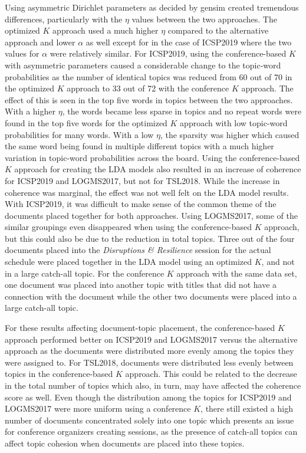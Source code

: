 \documentclass[a4paper, 12pt, twoside]{article}
\numberwithin{equation}{section} %
\begin{document}
Using asymmetric Dirichlet parameters as decided by gensim created tremendous differences, particularly with the $\eta$ values between the two approaches. The optimized $K$ approach used a much higher $\eta$ compared to the alternative approach and lower $\alpha$ as well except for in the case of ICSP2019 where the two values for $\alpha$ were relatively similar. For ICSP2019, using the conference-based $K$ with asymmetric parameters caused a considerable change to the topic-word probabilities as the number of identical topics was reduced from 60 out of 70 in the optimized $K$ approach to 33 out of 72 with the conference $K$ approach. The effect of this is seen in the top five words in topics between the two approaches. With a higher $\eta$, the words became less sparse in topics and no repeat words were found in the top five words for the optimized $K$ approach with low topic-word probabilities for many words. With a low $\eta$, the sparsity was higher which caused the same word being found in multiple different topics with a much higher variation in topic-word probabilities across the board. Using the conference-based $K$ approach for creating the LDA models also resulted in an increase of coherence for ICSP2019 and LOGMS2017, but not for TSL2018. While the increase in coherence was marginal, the effect was not well felt on the LDA model results. With ICSP2019, it was difficult to make sense of the common theme of the documents placed together for both approaches. Using LOGMS2017, some of the similar groupings even disappeared when using the conference-based $K$ approach, but this could also be due to the reduction in total topics. Three out of the four documents placed into the \textit{Disruptions \& Resilience} session for the actual schedule were placed together in the LDA model using an optimized $K$, and not in a large catch-all topic. For the conference $K$ approach with the same data set, one document was placed into another topic with titles that did not have a connection with the document while the other two documents were placed into a large catch-all topic. 

For these results affecting document-topic placement, the conference-based $K$ approach performed better on ICSP2019 and LOGMS2017 versus the alternative approach as the documents were distributed more evenly among the topics they were assigned to. For TSL2018, documents were distributed less evenly between topics in the conference-based $K$ approach. This could be related to the decrease in the total number of topics which also, in turn, may have affected the coherence score as well. Even though the distribution among the topics for ICSP2019 and LOGMS2017 were more uniform using a conference $K$, there still existed a high number of documents concentrated solely into one topic which presents an issue for conference organizers creating sessions, as the presence of catch-all topics can affect topic cohesion when documents are placed into these topics. 
\end{document}
